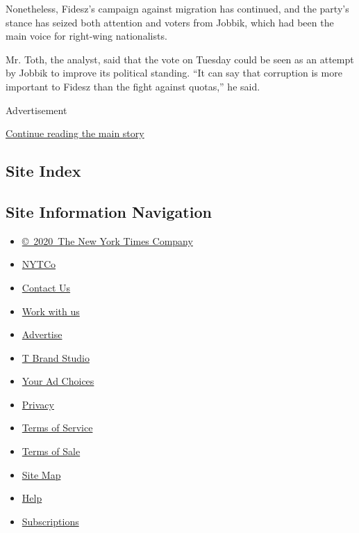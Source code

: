 Nonetheless, Fidesz's campaign against migration has continued, and the
party's stance has seized both attention and voters from Jobbik, which
had been the main voice for right-wing nationalists.

Mr. Toth, the analyst, said that the vote on Tuesday could be seen as an
attempt by Jobbik to improve its political standing. ``It can say that
corruption is more important to Fidesz than the fight against quotas,''
he said.

Advertisement

\protect\hyperlink{after-bottom}{Continue reading the main story}

\hypertarget{site-index}{%
\subsection{Site Index}\label{site-index}}

\hypertarget{site-information-navigation}{%
\subsection{Site Information
Navigation}\label{site-information-navigation}}

\begin{itemize}
\tightlist
\item
  \href{https://help.nytimes.com/hc/en-us/articles/115014792127-Copyright-notice}{©~2020~The
  New York Times Company}
\end{itemize}

\begin{itemize}
\tightlist
\item
  \href{https://www.nytco.com/}{NYTCo}
\item
  \href{https://help.nytimes.com/hc/en-us/articles/115015385887-Contact-Us}{Contact
  Us}
\item
  \href{https://www.nytco.com/careers/}{Work with us}
\item
  \href{https://nytmediakit.com/}{Advertise}
\item
  \href{http://www.tbrandstudio.com/}{T Brand Studio}
\item
  \href{https://www.nytimes.com/privacy/cookie-policy\#how-do-i-manage-trackers}{Your
  Ad Choices}
\item
  \href{https://www.nytimes.com/privacy}{Privacy}
\item
  \href{https://help.nytimes.com/hc/en-us/articles/115014893428-Terms-of-service}{Terms
  of Service}
\item
  \href{https://help.nytimes.com/hc/en-us/articles/115014893968-Terms-of-sale}{Terms
  of Sale}
\item
  \href{https://spiderbites.nytimes.com}{Site Map}
\item
  \href{https://help.nytimes.com/hc/en-us}{Help}
\item
  \href{https://www.nytimes.com/subscription?campaignId=37WXW}{Subscriptions}
\end{itemize}
